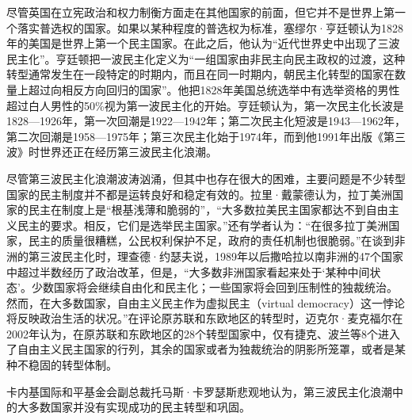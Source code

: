 尽管英国在立宪政治和权力制衡方面走在其他国家的前面，但它并不是世界上第一个落实普选权的国家。如果以某种程度的普选权为标准，塞缪尔·亨廷顿认为1828年的美国是世界上第一个民主国家。在此之后，他认为“近代世界史中出现了三波民主化”。亨廷顿把一波民主化定义为“一组国家由非民主向民主政权的过渡，这种转型通常发生在一段特定的时期内，而且在同一时期内，朝民主化转型的国家在数量上超过向相反方向回归的国家”。他把1828年美国总统选举中有选举资格的男性超过白人男性的50\%视为第一波民主化的开始。亨廷顿认为，第一次民主化长波是1828—1926年，第一次回潮是1922—1942年；第二次民主化短波是1943—1962年，第二次回潮是1958—1975年；第三次民主化始于1974年，而到他1991年出版《第三波》时世界还正在经历第三波民主化浪潮。

尽管第三波民主化浪潮波涛汹涌，但其中也存在很大的困难，主要问题是不少转型国家的民主制度并不都是运转良好和稳定有效的。拉里·戴蒙德认为，拉丁美洲国家的民主在制度上是“根基浅薄和脆弱的”，“大多数拉美民主国家都达不到自由主义民主的要求。相反，它们是选举民主国家。”还有学者认为：“在很多拉丁美洲国家，民主的质量很糟糕，公民权利保护不足，政府的责任机制也很脆弱。”在谈到非洲的第三波民主化时，理查德·约瑟夫说，1989年以后撒哈拉以南非洲的47个国家中超过半数经历了政治改革，但是，“大多数非洲国家看起来处于‘某种中间状态’。少数国家将会继续自由化和民主化；一些国家将会回到压制性的独裁统治。然而，在大多数国家，自由主义民主作为虚拟民主（virtual democracy）这一悖论将反映政治生活的状况。”在评论原苏联和东欧地区的转型时，迈克尔·麦克福尔在2002年认为，在原苏联和东欧地区的28个转型国家中，仅有捷克、波兰等8个进入了自由主义民主国家的行列，其余的国家或者为独裁统治的阴影所笼罩，或者是某种不稳固的转型体制。

卡内基国际和平基金会副总裁托马斯·卡罗瑟斯悲观地认为，第三波民主化浪潮中的大多数国家并没有实现成功的民主转型和巩固。


